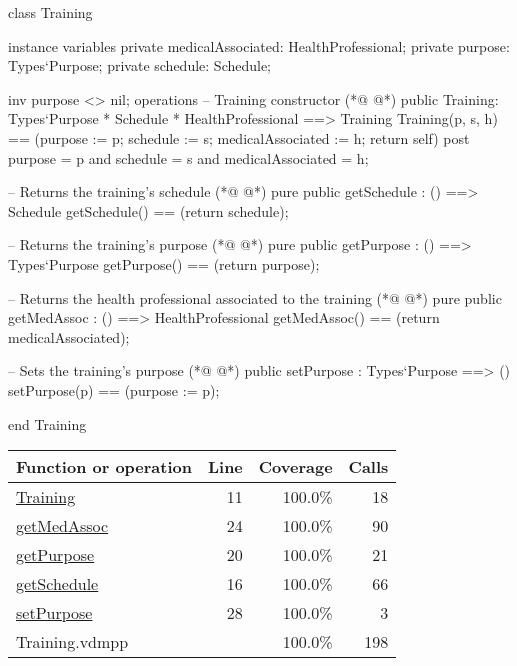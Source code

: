 \begin{vdmpp}[breaklines=true]
class Training
 
instance variables
 private medicalAssociated: HealthProfessional;
 private purpose: Types`Purpose;
 private schedule: Schedule;

 inv purpose <> nil;
operations
 -- Training constructor
(*@
\label{Training:11}
@*)
 public Training: Types`Purpose * Schedule * HealthProfessional ==> Training
   Training(p, s, h) == (purpose := p; schedule := s; medicalAssociated := h; return self)
 post purpose = p and schedule = s and medicalAssociated = h;
 
 -- Returns the training's schedule
(*@
\label{getSchedule:16}
@*)
 pure public getSchedule : () ==> Schedule
   getSchedule() == (return schedule);
 
 -- Returns the training's purpose
(*@
\label{getPurpose:20}
@*)
  pure public getPurpose : () ==> Types`Purpose
  getPurpose() == (return purpose); 
 
 -- Returns the health professional associated to the training
(*@
\label{getMedAssoc:24}
@*)
 pure public getMedAssoc : () ==> HealthProfessional
  getMedAssoc() == (return medicalAssociated); 
 
 -- Sets the training's purpose
(*@
\label{setPurpose:28}
@*)
 public setPurpose : Types`Purpose ==> ()
   setPurpose(p) == (purpose := p);
 
 end Training
\end{vdmpp}
\bigskip
\begin{longtable}{|l|r|r|r|}
\hline
Function or operation & Line & Coverage & Calls \\
\hline
\hline
\hyperref[Training:11]{Training} & 11&100.0\% & 18 \\
\hline
\hyperref[getMedAssoc:24]{getMedAssoc} & 24&100.0\% & 90 \\
\hline
\hyperref[getPurpose:20]{getPurpose} & 20&100.0\% & 21 \\
\hline
\hyperref[getSchedule:16]{getSchedule} & 16&100.0\% & 66 \\
\hline
\hyperref[setPurpose:28]{setPurpose} & 28&100.0\% & 3 \\
\hline
\hline
Training.vdmpp & & 100.0\% & 198 \\
\hline
\end{longtable}

